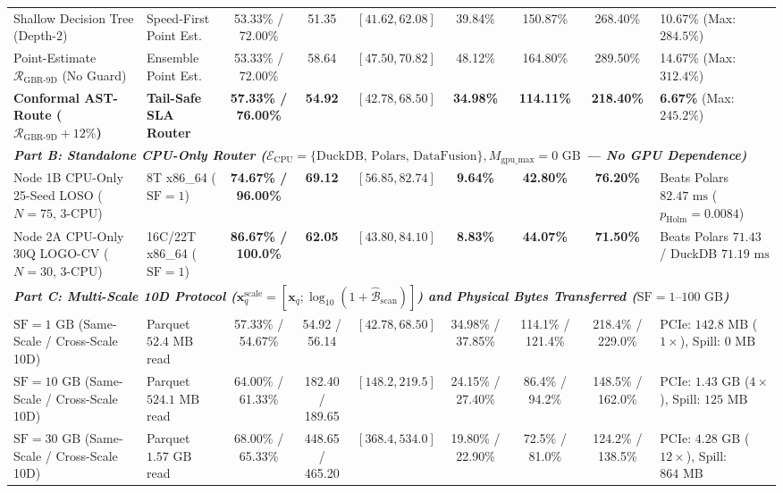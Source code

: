 \documentclass[10pt,a4paper]{article}
\newenvironment{fitasttable}{%
  \begin{lrbox}{\asttblbox}%
}{%
  \end{lrbox}%
  \sbox{\asttblboxB}{%
    \ifdim\wd\asttblbox>0.96\textwidth
      \resizebox{0.96\textwidth}{!}{\usebox{\asttblbox}}%
    \else
      \usebox{\asttblbox}%
    \fi
  }%
  \ifdim\ht\asttblboxB>0.72\textheight
    \resizebox{!}{0.72\textheight}{\usebox{\asttblboxB}}%
  \else
    \usebox{\asttblboxB}%
  \fi
}
\begin{document}
\begin{table}[t!]
\begin{fitasttable}
\begin{tabular}{@{}llccccccl@{}}
Shallow Decision Tree (Depth-2) & Speed-First Point Est. & 53.33\% / 72.00\% & 51.35 & $[41.62, 62.08]$ & 39.84\% & 150.87\% & 268.40\% & 10.67\% (Max: $284.5\%$) \\
Point-Estimate $\mathcal{R}_{\text{GBR-9D}}$ (No Guard) & Ensemble Point Est. & 53.33\% / 72.00\% & 58.64 & $[47.50, 70.82]$ & 48.12\% & 164.80\% & 289.50\% & 14.67\% (Max: $312.4\%$) \\
\textbf{Conformal AST-Route ($\mathcal{R}_{\text{GBR-9D}}+12\%$)} & \textbf{Tail-Safe SLA Router} & \textbf{57.33\% / 76.00\%} & \textbf{54.92} & $[42.78, 68.50]$ & \textbf{34.98\%} & \textbf{114.11\%} & \textbf{218.40\%} & \textbf{6.67\%} (Max: $245.2\%$) \\
\hline
\multicolumn{9}{l}{\textit{\textbf{Part B: Standalone CPU-Only Router ($\mathcal{E}_{\text{CPU}}=\{\text{DuckDB, Polars, DataFusion}\}, M_{\text{gpu\_max}}=0\text{ GB}$ --- No GPU Dependence)}}} \\
Node 1B CPU-Only 25-Seed LOSO ($N=75$, 3-CPU) & 8T x86\_64 ($\text{SF}=1$) & \textbf{74.67\% / 96.00\%} & \textbf{69.12} & $[56.85, 82.74]$ & \textbf{9.64\%} & \textbf{42.80\%} & \textbf{76.20\%} & Beats Polars $82.47\text{ ms}$ ($p_{\text{Holm}}=0.0084$) \\
Node 2A CPU-Only 30Q LOGO-CV ($N=30$, 3-CPU) & 16C/22T x86\_64 ($\text{SF}=1$) & \textbf{86.67\% / 100.0\%} & \textbf{62.05} & $[43.80, 84.10]$ & \textbf{8.83\%} & \textbf{44.07\%} & \textbf{71.50\%} & Beats Polars $71.43$ / DuckDB $71.19\text{ ms}$ \\
\hline
\multicolumn{9}{l}{\textit{\textbf{Part C: Multi-Scale 10D Protocol ($\mathbf{x}_q^{\text{scale}}=[\mathbf{x}_q; \log_{10}(1+\hat{\mathcal{B}}_{\text{scan}})]$) and Physical Bytes Transferred ($\text{SF}=1\text{--}100\text{ GB}$)}}} \\
$\text{SF}=1\text{ GB}$ (Same-Scale / Cross-Scale 10D) & Parquet $52.4\text{ MB}$ read & 57.33\% / 54.67\% & 54.92 / 56.14 & $[42.78, 68.50]$ & 34.98\% / 37.85\% & 114.1\% / 121.4\% & 218.4\% / 229.0\% & PCIe: $142.8\text{ MB}$ ($1\times$), Spill: $0\text{ MB}$ \\
$\text{SF}=10\text{ GB}$ (Same-Scale / Cross-Scale 10D) & Parquet $524.1\text{ MB}$ read & 64.00\% / 61.33\% & 182.40 / 189.65 & $[148.2, 219.5]$ & 24.15\% / 27.40\% & 86.4\% / 94.2\% & 148.5\% / 162.0\% & PCIe: $1.43\text{ GB}$ ($4\times$), Spill: $125\text{ MB}$ \\
$\text{SF}=30\text{ GB}$ (Same-Scale / Cross-Scale 10D) & Parquet $1.57\text{ GB}$ read & 68.00\% / 65.33\% & 448.65 / 465.20 & $[368.4, 534.0]$ & 19.80\% / 22.90\% & 72.5\% / 81.0\% & 124.2\% / 138.5\% & PCIe: $4.28\text{ GB}$ ($12\times$), Spill: $864\text{ MB}$ \\

\end{tabular}
\end{fitasttable}
\end{table}
\end{document}
